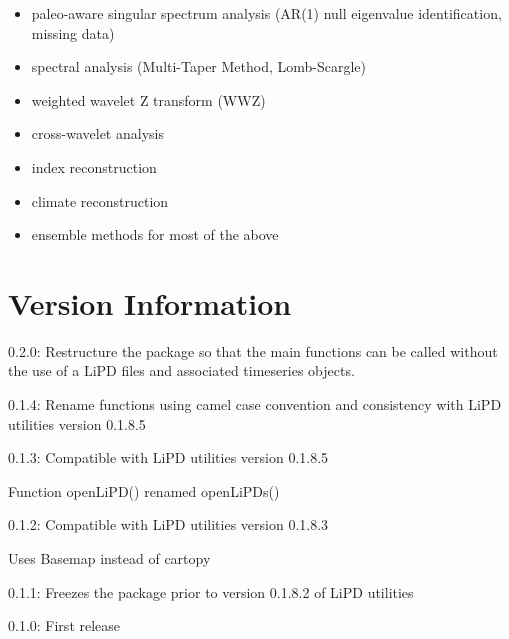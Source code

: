 \documentclass[letterpaper,10pt,english]{sphinxmanual}
\begin{document}
\begin{itemize}
\item {} 
paleo-aware singular spectrum analysis (AR(1) null eigenvalue identification, missing data)

\item {} 
spectral analysis (Multi-Taper Method, Lomb-Scargle)

\item {} 
weighted wavelet Z transform (WWZ)

\item {} 
cross-wavelet analysis

\item {} 
index reconstruction

\item {} 
climate reconstruction

\item {} 
ensemble methods for most of the above

\end{itemize}


\section{Version Information}
\label{\detokenize{Introduction:version-information}}
\begin{DUlineblock}{0em}
\item[] 0.2.0: Restructure the package so that the main functions can be called without the use of a LiPD files and associated timeseries objects.
\item[] 0.1.4: Rename functions using camel case convention and consistency with LiPD utilities version 0.1.8.5
\item[] 0.1.3: Compatible with LiPD utilities version 0.1.8.5
\item[]
\begin{DUlineblock}{\DUlineblockindent}
\item[] Function openLiPD() renamed openLiPDs()
\end{DUlineblock}
\item[] 0.1.2: Compatible with LiPD utilities version 0.1.8.3
\item[]
\begin{DUlineblock}{\DUlineblockindent}
\item[] Uses Basemap instead of cartopy
\end{DUlineblock}
\item[] 0.1.1: Freezes the package prior to version 0.1.8.2 of LiPD utilities
\item[] 0.1.0: First release
\end{DUlineblock}
\end{document}
